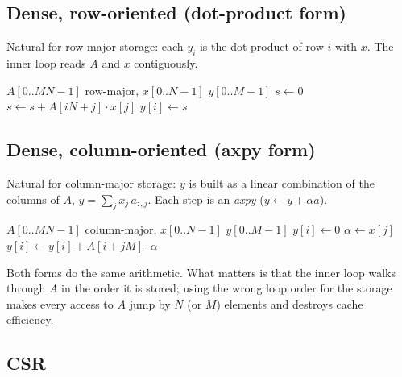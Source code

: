 \documentclass[11pt,a4paper]{article}
\begin{document}
\subsection{Dense, row-oriented (dot-product form)}

Natural for row-major storage: each $y_i$ is the dot product of row $i$
with $x$. The inner loop reads $A$ and $x$ contiguously.

\begin{algorithm}[H]
\caption{Dense $y = Ax$, row-major storage}
\label{alg:dense-row}
\begin{algorithmic}[1]
\Require $A[0..MN-1]$ row-major, $x[0..N-1]$
\Ensure $y[0..M-1]$
  \State $s \gets 0$
    \State $s \gets s + A[iN + j] \cdot x[j]$
  \EndFor
  \State $y[i] \gets s$
\EndFor
\end{algorithmic}
\end{algorithm}

\subsection{Dense, column-oriented (axpy form)}

Natural for column-major storage: $y$ is built as a linear combination of the
columns of $A$, $y = \sum_j x_j\, a_{:,j}$. Each step is an \emph{axpy}
($y \gets y + \alpha a$).

\begin{algorithm}[H]
\caption{Dense $y = Ax$, column-major storage}
\label{alg:dense-col}
\begin{algorithmic}[1]
\Require $A[0..MN-1]$ column-major, $x[0..N-1]$
\Ensure $y[0..M-1]$
  \State $y[i] \gets 0$
\EndFor
{}
  \State $\alpha \gets x[j]$
    \State $y[i] \gets y[i] + A[i + jM] \cdot \alpha$
  \EndFor
\EndFor
\end{algorithmic}
\end{algorithm}

\noindent Both forms do the same arithmetic. What matters is that the inner
loop walks through $A$ in the order it is stored; using the wrong loop order
for the storage makes every access to $A$ jump by $N$ (or $M$) elements and
destroys cache efficiency.

\subsection{CSR}
\end{document}
